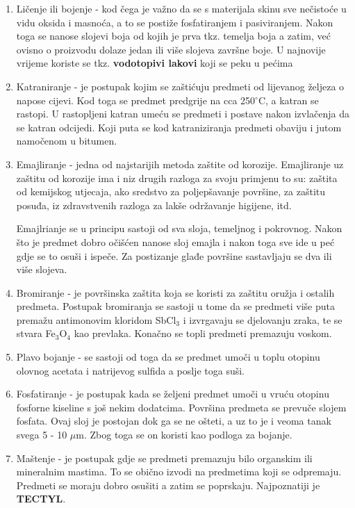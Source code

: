 \documentclass[a4paper,12pt]{article}
\numberwithin{figure}{section}
\begin{document}
\begin{enumerate}
\item Ličenje ili bojenje - kod čega je važno da se s materijala skinu sve nečistoće u vidu oksida i masnoća, a to se postiže fosfatiranjem i pasiviranjem. Nakon toga se nanose slojevi boja od kojih je prva tkz. temelja boja a zatim, već ovisno o proizvodu dolaze jedan ili više slojeva završne boje. U najnovije vrijeme koriste se tkz. \textbf{vodotopivi lakovi} koji se peku u pećima
\item Katraniranje - je postupak kojim se zaštićuju predmeti od lijevanog željeza o napose cijevi. Kod toga se predmet predgrije na cca 250$^{\circ}$C, a katran se rastopi. U rastopljeni katran umeću se predmeti i postave nakon izvlačenja da se katran odcijedi. Koji puta se kod katraniziranja predmeti obaviju i jutom namočenom u bitumen.
\item Emajliranje - jedna od najstarijih metoda zaštite od korozije. Emajliranje uz zaštitu od korozije ima i niz drugih razloga za svoju primjenu to su: zaštita od kemijskog utjecaja, ako sredstvo za poljepšavanje površine, za zaštitu posuđa, iz zdravstvenih razloga za lakše održavanje higijene, itd.\par
Emajlrianje se u principu sastoji od sva sloja, temeljnog i pokrovnog. Nakon što je predmet dobro očišćen nanose sloj emajla i nakon toga sve ide u peć gdje se to osuši i ispeče. Za postizanje glađe površine sastavljaju se dva ili više slojeva.
\item Bromiranje - je površinska zaštita koja se koristi za zaštitu oružja i ostalih predmeta. Postupak bromiranja se sastoji u tome da se predmeti više puta premažu antimonovim kloridom SbCl$_{3}$ i izvrgavaju se djelovanju zraka, te se stvara Fe$_{3}$O$_{4}$ kao prevlaka. Konačno se topli predmeti premazuju voskom.
\item Plavo bojanje - se sastoji od toga da se predmet umoči u toplu otopinu olovnog acetata i natrijevog sulfida a poslje toga suši.
\item Fosfatiranje - je postupak kada se željeni predmet umoči u vruću otopinu fosforne kiseline s još nekim dodatcima. Površina predmeta se prevuče slojem fosfata. Ovaj sloj je postojan dok ga se ne ošteti, a uz to je i veoma tanak svega 5 - 10 $\mu$m. Zbog toga se on koristi kao podloga za bojanje.
\item Maštenje - je postupak gdje se predmeti premazuju bilo organskim ili mineralnim mastima. To se obično izvodi na predmetima koji se odpremaju. Predmeti se moraju dobro osušiti a zatim se poprskaju. Najpoznatiji je \textbf{TECTYL}. 
\end{enumerate} 
\end{document}
